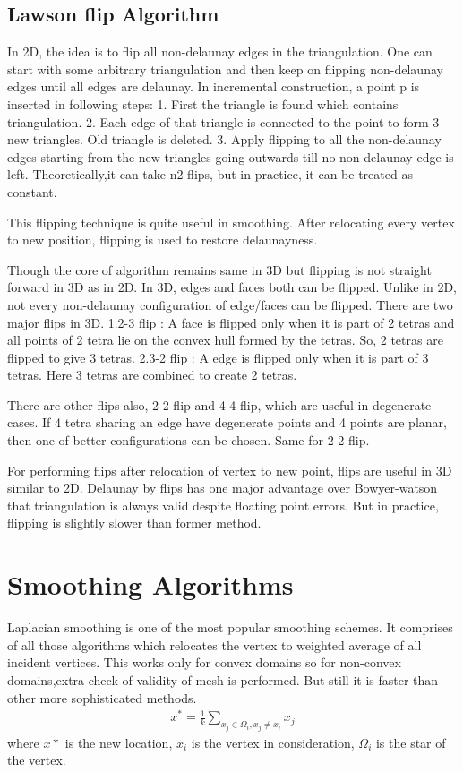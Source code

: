 \subsection{Lawson flip Algorithm}
In 2D, the idea is to flip all non-delaunay edges in the triangulation. One can start with some arbitrary triangulation and then keep on flipping non-delaunay edges until all edges are delaunay. In incremental construction, a point p is inserted in following steps:
1. First the triangle is found which contains triangulation.
2. Each edge of that triangle is connected to the point to form 3 new triangles. Old triangle is deleted.
3. Apply flipping to all the non-delaunay edges starting from the new triangles going outwards till no non-delaunay edge is left. Theoretically,it can take n2 flips, but in practice, it can be treated as constant.

This flipping technique is quite useful in smoothing. After relocating every vertex to new position, flipping is used to restore delaunayness.

Though the core of algorithm remains same in 3D but flipping is not straight forward in 3D as in 2D. In 3D, edges and faces both can be flipped. Unlike in 2D, not every non-delaunay configuration of edge/faces  can be flipped. There are two major flips in 3D. 
1.2-3 flip : A face is flipped only when it is part of 2 tetras and all points of 2 tetra lie on the convex hull formed by the tetras. So, 2 tetras are flipped to give 3 tetras.
2.3-2 flip : A edge is flipped only when it is part of 3 tetras.
Here 3 tetras are combined to create 2 tetras.

There are other flips also, 2-2 flip and 4-4 flip, which are useful in degenerate cases. If 4 tetra sharing an edge have degenerate points and 4 points are planar, then one of better configurations can be chosen. Same for 2-2 flip.

For performing flips after relocation of vertex to new point, flips are useful in 3D similar to 2D. Delaunay by flips has one major advantage over Bowyer-watson that triangulation is always valid despite floating point errors. But in practice, flipping is slightly slower than former method.

\section{Smoothing Algorithms}
Laplacian smoothing is one of the most popular smoothing schemes. It comprises of all those algorithms which relocates the vertex to weighted average of all incident vertices. This works only for convex domains so for non-convex domains,extra check of validity of mesh is performed. But still it is faster than other more sophisticated methods. 
\begin{eqnarray}
x^*= \frac{1}{k} \sum_{x_j \in \Omega_i, x_j \neq x_i} x_j
\end{eqnarray}
where $x*$ is the new location, $x_i$ is the vertex in consideration, $\Omega_i$ is the star of the vertex.

